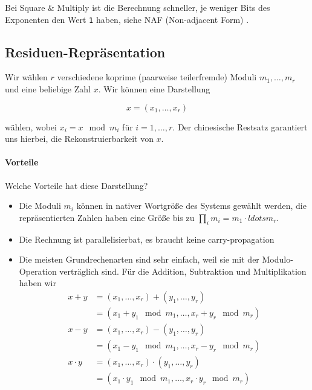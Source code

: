 Bei Square \& Multiply ist die Berechnung schneller, je weniger Bits des Exponenten den Wert \verb|1| haben, siehe NAF  (Non-adjacent Form) .

\subsection{Residuen-Repräsentation} 

Wir wählen $r$ verschiedene koprime (paarweise teilerfremde) Moduli $m_1, \ldots, m_r$ und eine beliebige Zahl $x$. Wir können eine Darstellung

\begin{equation}
    x = (x_1, \ldots, x_r)
\end{equation}

wählen, wobei $x_i = x \mod m_i$ für $i = 1, \ldots, r$. Der chinesische Restsatz garantiert uns hierbei, die Rekonstruierbarkeit von $x$.

\paragraph{Vorteile}
Welche Vorteile hat diese Darstellung?  

\begin{itemize}
    \item Die Moduli $m_i$ können in nativer Wortgröße des Systems gewählt werden, die repräsentierten Zahlen haben eine Größe bis zu $\prod_i m_i = m_1 \cdot 
    ldots m_r$.
    \item Die Rechnung ist parallelisierbat, es braucht keine carry-propagation 
    \item Die meisten Grundrechenarten sind sehr einfach, weil sie mit der Modulo-Operation verträglich sind. Für die Addition, Subtraktion und Multiplikation haben wir
        \begin{align*}
            x + y     &= (x_1, \ldots, x_r) + (y_1, \ldots, y_r)     \\
                      &= (x_1 + y_1 \mod m_1, \ldots, x_r + y_r \mod m_r) \\
            x - y     &= (x_1, \ldots, x_r) - (y_1, \ldots, y_r)     \\ 
                      &= (x_1 - y_1 \mod m_1, \ldots, x_r - y_r \mod m_r) \\
            x \cdot y &= (x_1, \ldots, x_r) \cdot (y_1, \ldots, y_r) \\ 
                      &= (x_1 \cdot y_1 \mod m_1, \ldots, x_r \cdot y_r \mod m_r) 
        \end{align*}
\end{itemize}

